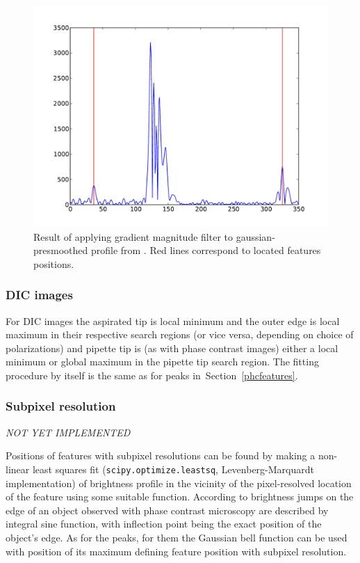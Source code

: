\begin{figure}%
\includegraphics[width=\columnwidth]{figs/phcprofilegrad.pdf}%
\caption{Result of applying gradient magnitude filter to gaussian-presmoothed profile from . Red lines correspond to located features positions.}%
\label{fig:phcprofilegrad}%
\end{figure}

\subsubsection{DIC images}\label{dicfeatures}

For DIC images the aspirated tip is local minimum and the outer edge is local maximum in their respective search regions (or vice versa, depending on choice of polarizations) and pipette tip is (as with phase contrast images) either a local minimum or global maximum in the pipette tip search region. The fitting procedure by itself is the same as for peaks in~Section~\ref{phcfeatures}.

\subsubsection{Subpixel resolution}\label{subpix}
\emph{NOT YET IMPLEMENTED}

Positions of features with subpixel resolutions can be found by making a non-linear least squares fit (\texttt{scipy.optimize.leastsq}, Levenberg-Marquardt implementation) of brightness profile in the vicinity of the pixel-resolved location of the feature using some suitable function. According to \cite{Bitler1999} brightness jumps on the edge of an object observed with phase contrast microscopy are described by integral sine function, with inflection point being the exact position of the object's edge. As for the peaks, for them the Gaussian bell function can be used with position of its maximum defining feature position with subpixel resolution.


